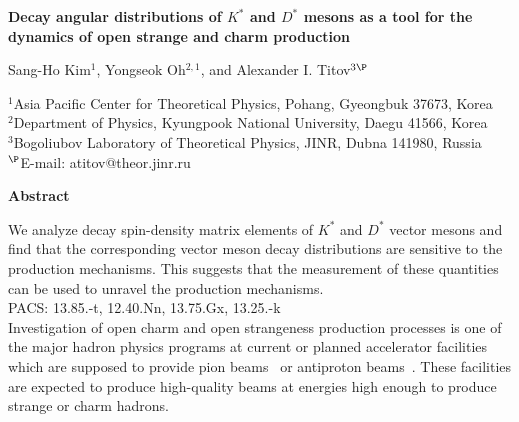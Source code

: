 \documentclass[a4paper,12pt]{article}
\begin{document}
\begin{center}

{\large\bf
Decay angular distributions of $K^*$ and $D^*$ mesons  as a tool for the dynamics
of open strange and charm production}

\medskip

{Sang-Ho Kim$^{1}$, Yongseok Oh$^{2,1}$, and Alexander I. Titov$^{3\P}$ }

\medskip

$^1${Asia Pacific Center for Theoretical Physics, Pohang, Gyeongbuk 37673, Korea}\\
$^2${Department of Physics, Kyungpook National University, Daegu 41566, Korea}\\
$^3${Bogoliubov Laboratory of Theoretical Physics, JINR, Dubna 141980, Russia}\\
$^\P${E-mail: atitov@theor.jinr.ru}

\end{center}

\centerline{\bf Abstract}
We analyze decay spin-density matrix elements of $K^*$ and $D^*$ vector mesons
and find that the corresponding vector meson decay distributions
are sensitive to the production mechanisms.
This suggests that the measurement of these quantities can be used to unravel the production mechanisms. \\


PACS:{ 13.85.-t, %
12.40.Nn,	%
13.75.Gx,	%
13.25.-k	%
}\\

Investigation of open charm and open strangeness production processes is one of
the major hadron physics programs at current or planned accelerator facilities which are supposed to provide pion
beams~\cite{MNNS12} or antiproton beams~\cite{Friese06}.
These facilities are expected to produce high-quality beams at energies high enough to produce
strange or charm hadrons.
\end{document}
